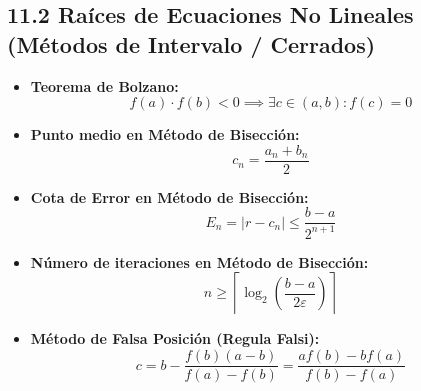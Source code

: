 \documentclass[11pt,a4paper]{article}
\begin{document}
\subsection*{11.2 Raíces de Ecuaciones No Lineales (Métodos de Intervalo / Cerrados)}

\begin{itemize}
  \item \textbf{Teorema de Bolzano:}
  \[
    f(a) \cdot f(b) < 0 \implies \exists c \in (a, b) : f(c) = 0
  \]
  \item \textbf{Punto medio en Método de Bisección:}
  \[
    c_n = \frac{a_n + b_n}{2}
  \]
  \item \textbf{Cota de Error en Método de Bisección:}
  \[
    E_n = |r - c_n| \le \frac{b - a}{2^{n+1}}
  \]
  \item \textbf{Número de iteraciones en Método de Bisección:}
  \[
    n \ge \left\lceil \log_2\left(\frac{b - a}{2\varepsilon}\right) \right\rceil
  \]
  \item \textbf{Método de Falsa Posición (Regula Falsi):}
  \[
    c = b - \frac{f(b)(a - b)}{f(a) - f(b)} = \frac{a f(b) - b f(a)}{f(b) - f(a)}
  \]
\end{itemize}
\end{document}

